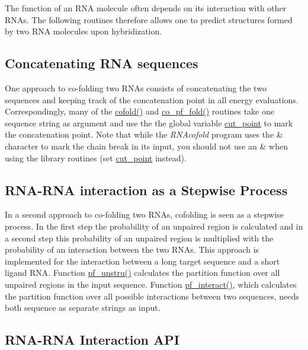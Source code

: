 The function of an R\+NA molecule often depends on its interaction with other R\+N\+As. The following routines therefore allows one to predict structures formed by two R\+NA molecules upon hybridization.\hypertarget{rip_rip_concat}{}\subsection{Concatenating R\+N\+A sequences}\label{rip_rip_concat}
One approach to co-\/folding two R\+N\+As consists of concatenating the two sequences and keeping track of the concatenation point in all energy evaluations. Correspondingly, many of the \hyperlink{group__mfe__global__deprecated_gabc8517f22cfe70595ee81fc837910d52}{cofold()} and \hyperlink{group__part__func__global__deprecated_gae5c1e7331718669bdae7a86de2be6184}{co\+\_\+pf\+\_\+fold()} routines take one sequence string as argument and use the the global variable \hyperlink{fold__vars_8h_ab9b2c3a37a5516614c06d0ab54b97cda}{cut\+\_\+point} to mark the concatenation point. Note that while the {\itshape R\+N\+Acofold} program uses the \textquotesingle{}\&\textquotesingle{} character to mark the chain break in its input, you should not use an \textquotesingle{}\&\textquotesingle{} when using the library routines (set \hyperlink{fold__vars_8h_ab9b2c3a37a5516614c06d0ab54b97cda}{cut\+\_\+point} instead).\hypertarget{rip_rip_stepwise}{}\subsection{R\+N\+A-\/\+R\+N\+A interaction as a Stepwise Process}\label{rip_rip_stepwise}
In a second approach to co-\/folding two R\+N\+As, cofolding is seen as a stepwise process. In the first step the probability of an unpaired region is calculated and in a second step this probability of an unpaired region is multiplied with the probability of an interaction between the two R\+N\+As. This approach is implemented for the interaction between a long target sequence and a short ligand R\+NA. Function \hyperlink{group__up__cofold_ga5b4ee40e190d2f633cd01cf0d2fe93cf}{pf\+\_\+unstru()} calculates the partition function over all unpaired regions in the input sequence. Function \hyperlink{group__up__cofold_ga1aa0aa02bc3a724f87360c03097afd00}{pf\+\_\+interact()}, which calculates the partition function over all possible interactions between two sequences, needs both sequence as separate strings as input.\hypertarget{rip_rip_api}{}\subsection{R\+N\+A-\/\+R\+N\+A Interaction A\+PI}\label{rip_rip_api}
